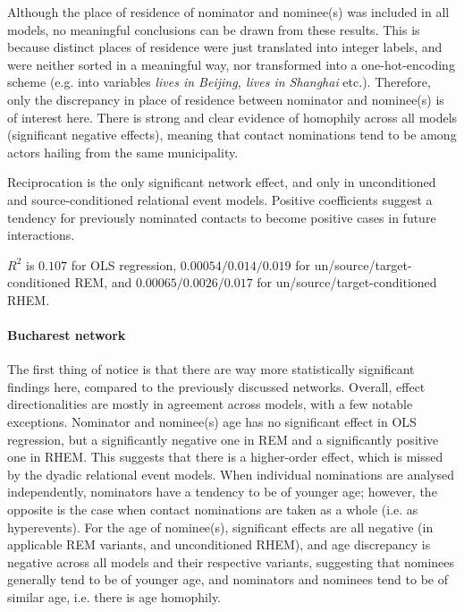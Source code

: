 Although the place of residence of nominator and nominee(s) was included in all models, no meaningful conclusions can be drawn from these results. This is because distinct places of residence were just translated into integer labels, and were neither sorted in a meaningful way, nor transformed into a one-hot-encoding scheme (e.g. into variables \emph{lives in Beijing, lives in Shanghai} etc.). Therefore, only the discrepancy in place of residence between nominator and nominee(s) is of interest here. There is strong and clear evidence of homophily across all models (significant negative effects), meaning that contact nominations tend to be among actors hailing from the same municipality. 

Reciprocation is the only significant network effect, and only in unconditioned and source-conditioned relational event models. Positive coefficients suggest a tendency for previously nominated contacts to become positive cases in future interactions.

$R^2$ is $0.107$ for OLS regression, $0.00054/0.014/0.019$ for un/source/target-conditioned REM, and $0.00065/0.0026/0.017$ for un/source/target-conditioned RHEM.

\paragraph{Bucharest network} The first thing of notice is that there are way more statistically significant findings here, compared to the previously discussed networks. Overall, effect directionalities are mostly in agreement across models, with a few notable exceptions. Nominator and nominee(s) age has no significant effect in OLS regression, but a significantly negative one in REM and a significantly positive one in RHEM. This suggests that there is a higher-order effect, which is missed by the dyadic relational event models. When individual nominations are analysed independently, nominators have a tendency to be of younger age; however, the opposite is the case when contact nominations are taken as a whole (i.e. as hyperevents). For the age of nominee(s), significant effects are all negative (in applicable REM variants, and unconditioned RHEM), and age discrepancy is negative across all models and their respective variants, suggesting that nominees generally tend to be of younger age, and nominators and nominees tend to be of similar age, i.e. there is age homophily. 

